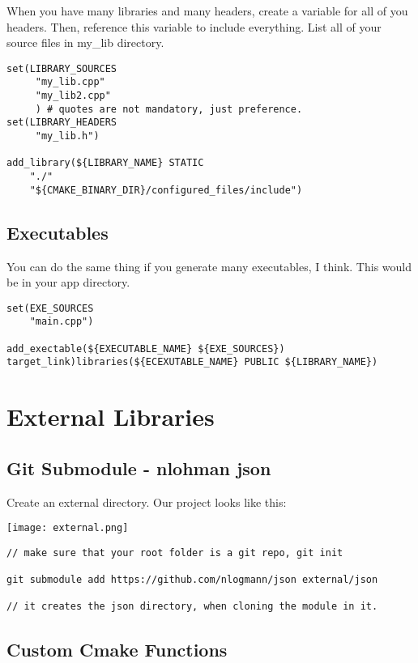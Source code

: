When you have many libraries and many headers, create a variable for all of you headers. Then, reference this variable to include
everything. List all of your source files in my\_lib directory.

\begin{verbatim}
set(LIBRARY_SOURCES
     "my_lib.cpp"
     "my_lib2.cpp"
     ) # quotes are not mandatory, just preference.
set(LIBRARY_HEADERS
     "my_lib.h")

add_library(${LIBRARY_NAME} STATIC
    "./"
    "${CMAKE_BINARY_DIR}/configured_files/include")
\end{verbatim}

\subsection{Executables}

You can do the same thing if you generate many executables, I think. This would be in your app directory.

\begin{verbatim}
set(EXE_SOURCES
    "main.cpp")

add_exectable(${EXECUTABLE_NAME} ${EXE_SOURCES})
target_link)libraries(${ECEXUTABLE_NAME} PUBLIC ${LIBRARY_NAME})
\end{verbatim}


\section{External Libraries}


\subsection{Git Submodule - nlohman json}

Create an external directory. Our project looks like this:

\begin{center}
    \texttt{[image: external.png]}
\end{center}

\begin{verbatim}
// make sure that your root folder is a git repo, git init

git submodule add https://github.com/nlogmann/json external/json

// it creates the json directory, when cloning the module in it.
\end{verbatim}

\subsection{Custom Cmake Functions}

